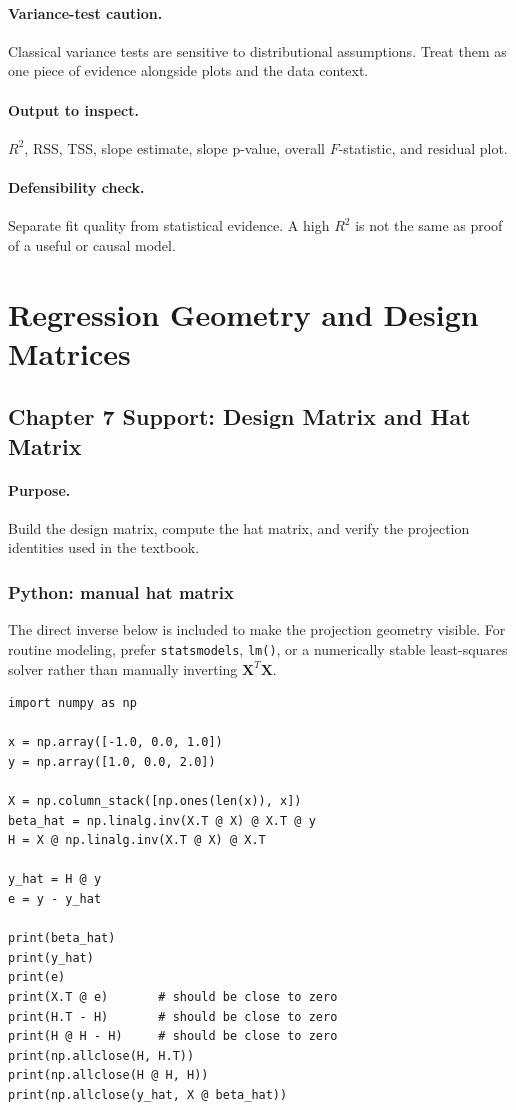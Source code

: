 \paragraph{Variance-test caution.} Classical variance tests are sensitive to distributional assumptions.  Treat them as one piece of evidence alongside plots and the data context.

\paragraph{Output to inspect.} \(R^2\), RSS, TSS, slope estimate, slope p-value, overall \(F\)-statistic, and residual plot.

\paragraph{Defensibility check.} Separate fit quality from statistical evidence.  A high \(R^2\) is not the same as proof of a useful or causal model.

\section{Regression Geometry and Design Matrices}
\label{app:cookbook-regression-geometry}

\subsection{Chapter 7 Support: Design Matrix and Hat Matrix}
\label{app:ch07-software-cookbook-design-matrix-and-hat-matrix}

\paragraph{Purpose.} Build the design matrix, compute the hat matrix, and verify the projection identities used in the textbook.

\subsubsection*{Python: manual hat matrix}

The direct inverse below is included to make the projection geometry visible.  For routine modeling, prefer \texttt{statsmodels}, \texttt{lm()}, or a numerically stable least-squares solver rather than manually inverting \(\mathbf{X}^T\mathbf{X}\).

\begin{verbatim}
import numpy as np

x = np.array([-1.0, 0.0, 1.0])
y = np.array([1.0, 0.0, 2.0])

X = np.column_stack([np.ones(len(x)), x])
beta_hat = np.linalg.inv(X.T @ X) @ X.T @ y
H = X @ np.linalg.inv(X.T @ X) @ X.T

y_hat = H @ y
e = y - y_hat

print(beta_hat)
print(y_hat)
print(e)
print(X.T @ e)       # should be close to zero
print(H.T - H)       # should be close to zero
print(H @ H - H)     # should be close to zero
print(np.allclose(H, H.T))
print(np.allclose(H @ H, H))
print(np.allclose(y_hat, X @ beta_hat))
\end{verbatim}

